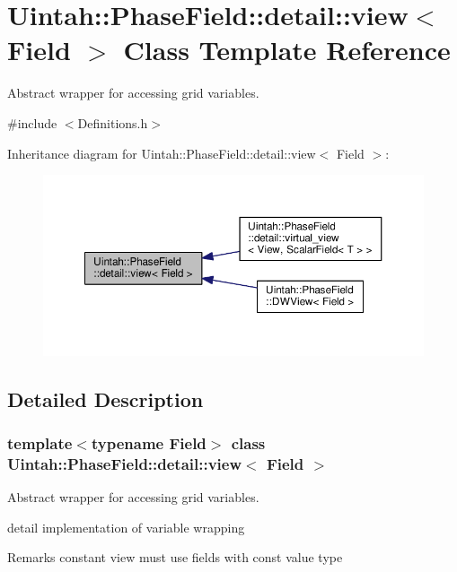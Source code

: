 \hypertarget{classUintah_1_1PhaseField_1_1detail_1_1view}{}\section{Uintah\+:\+:Phase\+Field\+:\+:detail\+:\+:view$<$ Field $>$ Class Template Reference}
\label{classUintah_1_1PhaseField_1_1detail_1_1view}


Abstract wrapper for accessing grid variables.  




{\ttfamily \#include $<$Definitions.\+h$>$}



Inheritance diagram for Uintah\+:\+:Phase\+Field\+:\+:detail\+:\+:view$<$ Field $>$\+:\nopagebreak
\begin{figure}[H]
\begin{center}
\leavevmode
\includegraphics[width=350pt]{classUintah_1_1PhaseField_1_1detail_1_1view__inherit__graph}
\end{center}
\end{figure}


\subsection{Detailed Description}
\subsubsection*{template$<$typename Field$>$\newline
class Uintah\+::\+Phase\+Field\+::detail\+::view$<$ Field $>$}

Abstract wrapper for accessing grid variables. 

detail implementation of variable wrapping

\begin{DoxyRemark}{Remarks}
constant view must use fields with const value type
\end{DoxyRemark}

